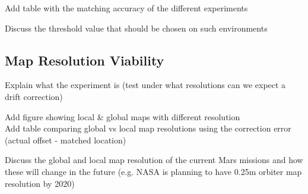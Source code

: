 \bigskip
\noindent
Add table with the matching accuracy of the different experiments

\bigskip
\noindent
Discuss the threshold value that should be chosen on such environments

\subsection{Map Resolution Viability}

Explain what the experiment is (test under what resolutions can we expect a drift correction)

\bigskip
\noindent
Add figure showing local \& global maps with different resolution\\
Add table comparing global vs local map resolutions using the correction error (actual offset - matched location)

\bigskip
\noindent
Discuss the global and local map resolution of the current Mars missions and how these will change in the future (e.g. NASA is planning to have 0.25m orbiter map resolution by 2020)

